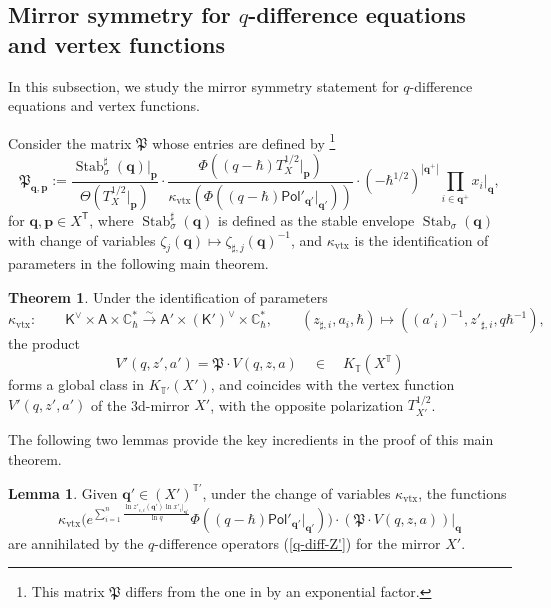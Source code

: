 \documentclass[10pt]{amsart}
\theoremstyle{definition}
\def\CC{{\mathbb{C}}}
\def\TT{\mathbb{T}}
\newcommand{\bp}{\mathbf{p}}
\newcommand{\bq}{\mathbf{q}}
\newcommand{\Stab}{\operatorname{Stab}}
\newcommand{\fP}{\mathfrak{P}}
\newcommand{\bA}{\mathsf{A}}
\newcommand{\Pol}{\mathsf{Pol}}
\newcommand{\bT}{\mathsf{T}}
\newcommand{\bK}{\mathsf{K}}
\theoremstyle{definition}
\numberwithin{equation}{section}
\theoremstyle{Theorem}
\newtheorem{Theorem}[Definition]{Theorem}
\newtheorem{Lemma}[Definition]{Lemma}
\begin{document}
\subsection{Mirror symmetry for $q$-difference equations and vertex functions}

In this subsection, we study the mirror symmetry statement for $q$-difference equations and vertex functions.

Consider the matrix $\fP$ whose entries are defined by \footnote{This matrix $\fP$ differs from the one in \cite{AOelliptic} by an exponential factor.}
$$
\fP_{\bq, \bp} := \frac{\Stab^\sharp_{\sigma} (\bq) |_\bp}{\Theta (T^{1/2}_X \big|_\bp )}  \cdot \frac{\Phi ((q-\hbar) T^{1/2}_X \big|_\bp ) }{\kappa_{\mathrm{vtx}} (\Phi ((q-\hbar) \Pol'_{\bq'} |_{\bq'} ) )}    \cdot (-\hbar^{1/2})^{|\bq^+|} \prod_{i\in \bq^+} x_i |_\bq ,
$$
for $\bq, \bp \in X^\bT$, where $\Stab^\sharp_{\sigma} (\bq)$ is defined as the stable envelope $\Stab_\sigma (\bq)$ with change of variables $\zeta_j (\bq) \mapsto \zeta_{\sharp, j} (\bq)^{-1}$, and $\kappa_{\mathrm{vtx}}$ is the identification of parameters in the following main theorem.

\begin{Theorem} \label{main-theorem}
Under the identification of parameters
$$
\kappa_{\mathrm{vtx}}:  \qquad \bK^\vee \times \bA \times \CC^*_\hbar \xrightarrow{\sim} \bA' \times (\bK')^\vee \times \CC^*_\hbar, \qquad ( z_{\sharp, i} , a_i, \hbar) \mapsto ( (a'_i)^{-1}, z'_{\sharp, i},  q \hbar^{-1}),
$$	
the product
$$
V'(q, z', a') = \fP \cdot V (q, z, a)  \quad \in \quad  K_\TT (X^\TT)
$$
forms a global class in $K_{\TT'} (X')$, and coincides with the vertex function $V'(q, z', a')$ of the 3d-mirror $X'$, with the opposite polarization $T^{1/2}_{X'}$.
\end{Theorem}

The following two lemmas provide the key incredients in the proof of this main theorem.

\begin{Lemma} \label{Criterion-1}
Given $\bq' \in (X')^{\TT'}$, under the change of variables $\kappa_{\mathrm{vtx}}$, the functions
$$
\kappa_{\mathrm{vtx}} \Big( e^{\sum_{i=1}^n \frac{\ln z'_{\epsilon, i} (\bq')  \ln x'_i |_{\bq'}}{\ln q}} \Phi ((q-\hbar) \Pol'_{\bq'} |_{\bq'} ) \Big) \cdot ( \fP \cdot V(q,z,a) ) \big|_\bq
$$
are annihilated by the $q$-difference operators (\ref{q-diff-Z'}) for the mirror $X'$.
\end{Lemma}
\end{document}
